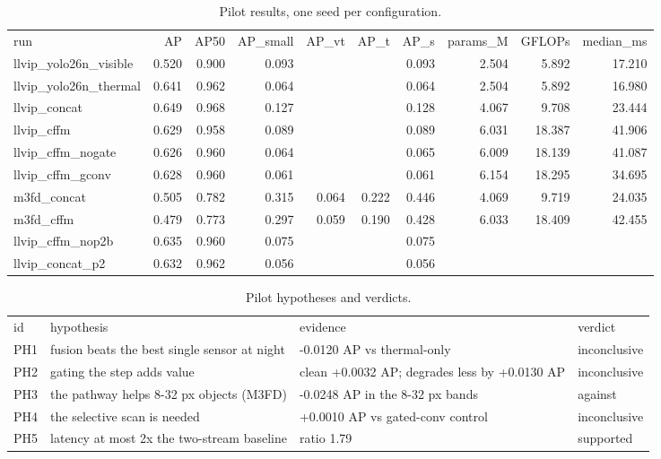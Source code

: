 \begin{table}[htbp]
\centering
\caption{Pilot results, one seed per configuration.}
\label{tab:pilot}
\small
\begin{tabular}{@{}lrrrrrrrrr@{}}
run & AP & AP50 & AP\_small & AP\_vt & AP\_t & AP\_s & params\_M & GFLOPs & median\_ms \\ \addlinespace[5pt]
llvip\_yolo26n\_visible & 0.520 & 0.900 & 0.093 &  &  & 0.093 & 2.504 & 5.892 & 17.210 \\
llvip\_yolo26n\_thermal & 0.641 & 0.962 & 0.064 &  &  & 0.064 & 2.504 & 5.892 & 16.980 \\
llvip\_concat & 0.649 & 0.968 & 0.127 &  &  & 0.128 & 4.067 & 9.708 & 23.444 \\
llvip\_cffm & 0.629 & 0.958 & 0.089 &  &  & 0.089 & 6.031 & 18.387 & 41.906 \\
llvip\_cffm\_nogate & 0.626 & 0.960 & 0.064 &  &  & 0.065 & 6.009 & 18.139 & 41.087 \\
llvip\_cffm\_gconv & 0.628 & 0.960 & 0.061 &  &  & 0.061 & 6.154 & 18.295 & 34.695 \\
m3fd\_concat & 0.505 & 0.782 & 0.315 & 0.064 & 0.222 & 0.446 & 4.069 & 9.719 & 24.035 \\
m3fd\_cffm & 0.479 & 0.773 & 0.297 & 0.059 & 0.190 & 0.428 & 6.033 & 18.409 & 42.455 \\
llvip\_cffm\_nop2b & 0.635 & 0.960 & 0.075 &  &  & 0.075 &  &  &  \\
llvip\_concat\_p2 & 0.632 & 0.962 & 0.056 &  &  & 0.056 &  &  &  \\
\end{tabular}
\end{table}

\begin{table}[htbp]
\centering
\caption{Pilot hypotheses and verdicts.}
\label{tab:pilot-hyp}
\small
\begin{tabular}{@{}llll@{}}
id & hypothesis & evidence & verdict \\ \addlinespace[5pt]
PH1 & fusion beats the best single sensor at night & -0.0120 AP vs thermal-only & inconclusive \\
PH2 & gating the step adds value & clean +0.0032 AP; degrades less by +0.0130 AP & inconclusive \\
PH3 & the pathway helps 8-32 px objects (M3FD) & -0.0248 AP in the 8-32 px bands & against \\
PH4 & the selective scan is needed & +0.0010 AP vs gated-conv control & inconclusive \\
PH5 & latency at most 2x the two-stream baseline & ratio 1.79 & supported \\
\end{tabular}
\end{table}
